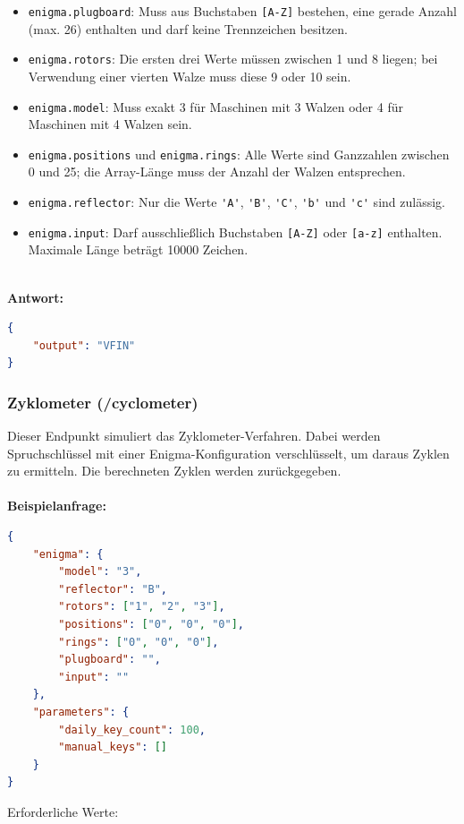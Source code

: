 \documentclass[12pt, ngerman, a4paper, numbers=noenddot]{article}
\begin{document}
\begin{itemize}
	\item \lstinline|enigma.plugboard|: Muss aus Buchstaben \lstinline|[A-Z]| bestehen, eine gerade Anzahl (max. 26) enthalten und darf keine Trennzeichen besitzen.
	\item \lstinline|enigma.rotors|: Die ersten drei Werte müssen zwischen 1 und 8 liegen; bei Verwendung einer vierten Walze muss diese 9 oder 10 sein.
	\item \lstinline|enigma.model|: Muss exakt 3 für Maschinen mit 3 Walzen oder 4 für Maschinen mit 4 Walzen sein.
	\item \lstinline|enigma.positions| und \lstinline|enigma.rings|: Alle Werte sind Ganzzahlen zwischen 0 und 25; die Array-Länge muss der Anzahl der Walzen entsprechen.
	\item \lstinline|enigma.reflector|: Nur die Werte \lstinline|'A'|, \lstinline|'B'|, \lstinline|'C'|, \lstinline|'b'| und \lstinline|'c'| sind zulässig.
	\item \lstinline|enigma.input|: Darf ausschließlich Buchstaben \lstinline|[A-Z]| oder \lstinline|[a-z]| enthalten. Maximale Länge beträgt 10000 Zeichen.
\end{itemize}
\ \\
\textbf{Antwort:}
\begin{lstlisting}[language=json, caption={Antwort auf /enigma-Anfrage}]
{
	"output": "VFIN"
}
\end{lstlisting}


\newpage
\subsubsection{Zyklometer (/cyclometer)}

Dieser Endpunkt simuliert das Zyklometer-Verfahren. Dabei werden Spruchschlüssel mit einer Enigma-Konfiguration verschlüsselt, um daraus Zyklen zu ermitteln. Die berechneten Zyklen werden zurückgegeben.
\ \\
\ \\
\textbf{Beispielanfrage:}
\begin{lstlisting}[language=json, caption={Gültige Anfrage an /cyclometer}]
{
	"enigma": {
		"model": "3",
		"reflector": "B",
		"rotors": ["1", "2", "3"],
		"positions": ["0", "0", "0"],
		"rings": ["0", "0", "0"],
		"plugboard": "",
		"input": ""
	},
	"parameters": {
		"daily_key_count": 100,
		"manual_keys": []
	}
}
\end{lstlisting}

Erforderliche Werte:
\end{document}

